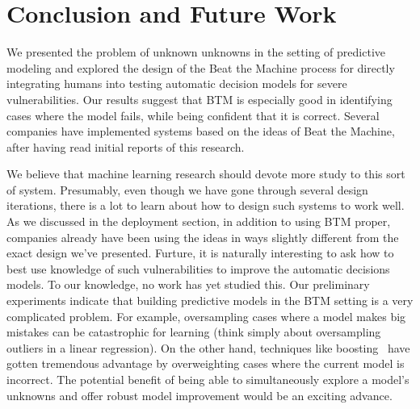 \section{Conclusion and Future Work}
\label{sec:conclusion}


We presented the problem of unknown unknowns in the setting of predictive modeling and explored the design of the Beat the Machine process for directly integrating humans into testing automatic decision models for severe vulnerabilities. Our results suggest that BTM is especially good in identifying cases where the model fails, while being confident that it is correct.   Several companies have implemented systems based on the ideas of Beat the Machine, after having read initial reports of this research.


We believe that machine learning research should devote more study to this sort of system.  Presumably, even though we have gone through several design iterations, there is a lot to learn about how to design such systems to work well.  As we discussed in the deployment section, in addition to using BTM proper, companies already have been using the ideas in ways slightly different from the exact design we've presented. 
Furture, it is naturally interesting to ask how to best use knowledge of such vulnerabilities to improve the automatic decisions models.  To our knowledge, no work has yet studied this.  Our preliminary experiments indicate that building predictive models in the BTM setting is a very complicated problem. For example, oversampling cases where a model makes big mistakes can be catastrophic for  learning (think simply about oversampling outliers in a linear regression). On the other hand, techniques like boosting~\cite{Freund99ashort} have gotten tremendous advantage by overweighting cases where the current model is incorrect. The potential benefit of being able to simultaneously explore a model's unknowns and offer robust model improvement would be an exciting advance.







